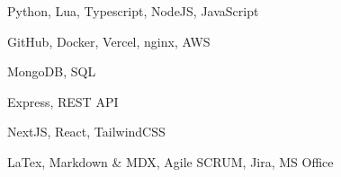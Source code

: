 
	

	\begin{SkillGroups}%
		{Python, Lua, Typescript, NodeJS, JavaScript}%
		
		{GitHub, Docker, Vercel, nginx, AWS}%
			
		{MongoDB, SQL}%
		
		{Express, REST API}%
		
		{NextJS, React, TailwindCSS}%
		
		{LaTex, Markdown \& MDX, Agile SCRUM, Jira, MS Office}%
	\end{SkillGroups}%

